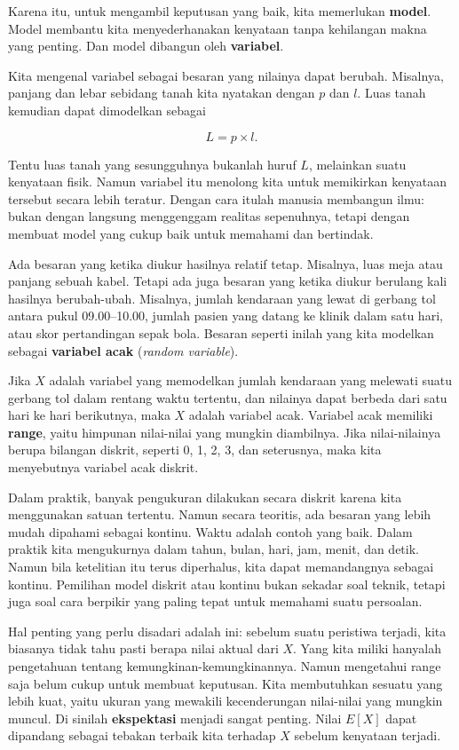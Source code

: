 \documentclass[
  letterpaper,
  DIV=11,
  numbers=noendperiod]{scrreprt}
\begin{document}
Karena itu, untuk mengambil keputusan yang baik, kita memerlukan
\textbf{model}. Model membantu kita menyederhanakan kenyataan tanpa
kehilangan makna yang penting. Dan model dibangun oleh
\textbf{variabel}.

Kita mengenal variabel sebagai besaran yang nilainya dapat berubah.
Misalnya, panjang dan lebar sebidang tanah kita nyatakan dengan \(p\)
dan \(l\). Luas tanah kemudian dapat dimodelkan sebagai

\[
L = p \times l.
\]

Tentu luas tanah yang sesungguhnya bukanlah huruf \(L\), melainkan suatu
kenyataan fisik. Namun variabel itu menolong kita untuk memikirkan
kenyataan tersebut secara lebih teratur. Dengan cara itulah manusia
membangun ilmu: bukan dengan langsung menggenggam realitas sepenuhnya,
tetapi dengan membuat model yang cukup baik untuk memahami dan
bertindak.

Ada besaran yang ketika diukur hasilnya relatif tetap. Misalnya, luas
meja atau panjang sebuah kabel. Tetapi ada juga besaran yang ketika
diukur berulang kali hasilnya berubah-ubah. Misalnya, jumlah kendaraan
yang lewat di gerbang tol antara pukul 09.00--10.00, jumlah pasien yang
datang ke klinik dalam satu hari, atau skor pertandingan sepak bola.
Besaran seperti inilah yang kita modelkan sebagai \textbf{variabel acak}
(\emph{random variable}).

Jika \(X\) adalah variabel yang memodelkan jumlah kendaraan yang
melewati suatu gerbang tol dalam rentang waktu tertentu, dan nilainya
dapat berbeda dari satu hari ke hari berikutnya, maka \(X\) adalah
variabel acak. Variabel acak memiliki \textbf{range}, yaitu himpunan
nilai-nilai yang mungkin diambilnya. Jika nilai-nilainya berupa bilangan
diskrit, seperti 0, 1, 2, 3, dan seterusnya, maka kita menyebutnya
variabel acak diskrit.

Dalam praktik, banyak pengukuran dilakukan secara diskrit karena kita
menggunakan satuan tertentu. Namun secara teoritis, ada besaran yang
lebih mudah dipahami sebagai kontinu. Waktu adalah contoh yang baik.
Dalam praktik kita mengukurnya dalam tahun, bulan, hari, jam, menit, dan
detik. Namun bila ketelitian itu terus diperhalus, kita dapat
memandangnya sebagai kontinu. Pemilihan model diskrit atau kontinu bukan
sekadar soal teknik, tetapi juga soal cara berpikir yang paling tepat
untuk memahami suatu persoalan.

Hal penting yang perlu disadari adalah ini: sebelum suatu peristiwa
terjadi, kita biasanya tidak tahu pasti berapa nilai aktual dari \(X\).
Yang kita miliki hanyalah pengetahuan tentang
kemungkinan-kemungkinannya. Namun mengetahui range saja belum cukup
untuk membuat keputusan. Kita membutuhkan sesuatu yang lebih kuat, yaitu
ukuran yang mewakili kecenderungan nilai-nilai yang mungkin muncul. Di
sinilah \textbf{ekspektasi} menjadi sangat penting. Nilai \(E[X]\) dapat
dipandang sebagai tebakan terbaik kita terhadap \(X\) sebelum kenyataan
terjadi.
\end{document}
